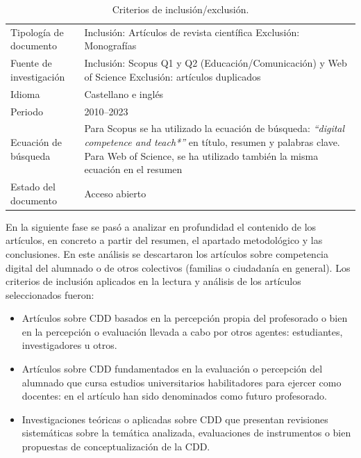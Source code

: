 \documentclass[spanish]{textolivre}
\begin{document}
\begin{table}[h!]
\centering
\caption{Criterios de inclusión/exclusión.}
\begin{tabular}{@{}lp{10.75cm}@{}}
\toprule
Tipología de documento & Inclusión: Artículos de revista científica \newline Exclusión: Monografías \\ 
Fuente de investigación & Inclusión: Scopus Q1 y Q2 (Educación/Comunicación) y Web of Science \newline Exclusión: artículos duplicados \\ 
Idioma & Castellano e inglés \\ 
Periodo & 2010--2023 \\ 
Ecuación de búsqueda & Para Scopus se ha utilizado la ecuación de búsqueda: \textit{``digital competence and teach*''} en título, resumen y palabras clave. Para Web of Science, se ha utilizado también la misma ecuación en el resumen \\ 
Estado del documento & Acceso abierto \\
\bottomrule
\end{tabular}
\label{tab-1}
\end{table}

En la siguiente fase se pasó a analizar en profundidad el contenido de los artículos, en concreto a partir del resumen, el apartado metodológico y las conclusiones. En este análisis se descartaron los artículos sobre competencia digital del alumnado o de otros colectivos (familias o ciudadanía en general). Los criterios de inclusión aplicados en la lectura y análisis de los artículos seleccionados fueron:

\begin{itemize}
\item Artículos sobre CDD basados en la percepción propia del profesorado o bien en la percepción o evaluación llevada a cabo por otros agentes: estudiantes, investigadores u otros.
\item  Artículos sobre CDD fundamentados en la evaluación o percepción del alumnado que cursa estudios universitarios habilitadores para ejercer como docentes: en el artículo han sido denominados como futuro profesorado.
\item  Investigaciones teóricas o aplicadas sobre CDD que presentan revisiones sistemáticas sobre la temática analizada, evaluaciones de instrumentos o bien propuestas de conceptualización de la CDD.
\end{itemize}
\end{document}
